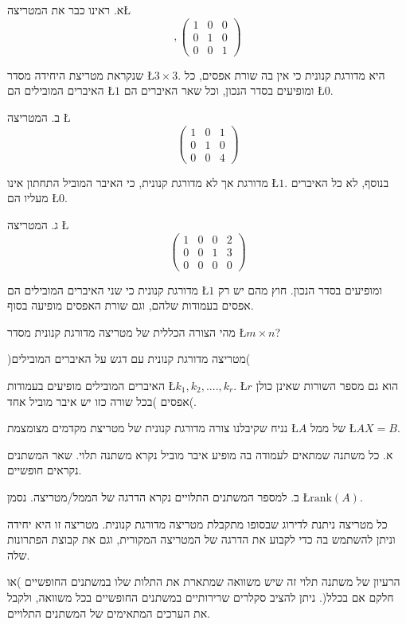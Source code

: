 \begin{examples}
א. ראינו כבר את המטריצה\L{%
\[
,\begin{pmatrix}1 & 0 & 0\\
0 & 1 & 0\\
0 & 0 & 1
\end{pmatrix}
\]
}%

שנקראת מטריצת היחידה מסדר \L{$3\times3$}. היא מדורגת קנונית כי אין
בה שורת אפסים, כל האיברים המובילים הם \L{$1$} ומופיעים בסדר הנכון, וכל
שאר האיברים הם \L{$0$}.

ב. המטריצה \L{%
\[
\begin{pmatrix}1 & 0 & 1\\
0 & 1 & 0\\
0 & 0 & 4
\end{pmatrix}
\]
}%

מדורגת אך לא מדורגת קנונית, כי האיבר המוביל התחתון אינו \L{$1$}.
בנוסף, לא כל האיברים מעליו הם \L{$0$}.

ג. המטריצה \L{%
\[
\begin{pmatrix}1 & 0 & 0 & 2\\
0 & 0 & 1 & 3\\
0 & 0 & 0 & 0
\end{pmatrix}
\]
}%

מדורגת קנונית כי שני האיברים המובילים הם \L{$1$} ומופיעים בסדר הנכון.
חוץ מהם יש רק אפסים בעמודות שלהם, וגם שורת האפסים מופיעה בסוף.
\end{examples}

מהי הצורה הכללית של מטריצה מדורגת קנונית מסדר \L{$m\times n$}? 
\begin{center}
)מטריצה מדורגת קנונית עם דגש על האיברים המובילים(
\par\end{center}

האיברים המובילים מופיעים בעמודות \L{$k_{1},k_{2},....,k_{r}$}. \L{$r$}
הוא גם מספר השורות שאינן כולן אפסים )בכל שורה כזו יש איבר מוביל אחד(. 

\begin{hdef}
נניח שקיבלנו צורה מדורגת קנונית של מטריצת מקדמים מצומצמת \L{$A$}
של ממ\textquotedbl ל \L{$AX=B$}.

א. כל משתנה שמתאים לעמודה בה מופיע איבר מוביל נקרא משתנה תלוי. שאר
המשתנים נקראים חופשיים.

ב. למספר המשתנים התלויים נקרא הדרגה של הממ\textquotedbl ל/מטריצה.
נסמן \L{$\text{rank}(A)$}.
\end{hdef}

\begin{remark}
כל מטריצה ניתנת לדירוג שבסופו מתקבלת מטריצה מדורגת קנונית. מטריצה
זו היא יחידה וניתן להשתמש בה כדי לקבוע את הדרגה של המטריצה המקורית,
וגם את קבוצת הפתרונות שלה.
\end{remark}
הרעיון של משתנה תלוי זה שיש משוואה שמתארת את התלות שלו במשתנים החופשיים
)או חלקם אם בכלל(. ניתן להציב סקלרים שרירותיים במשתנים החופשיים בכל
משוואה, ולקבל את הערכים המתאימים של המשתנים התלויים.


